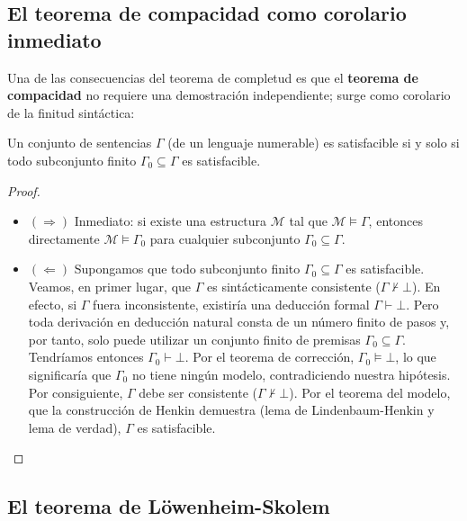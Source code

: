 \subsection{El teorema de compacidad como corolario inmediato}

Una de las consecuencias del teorema de completud es que el
\textbf{teorema de compacidad} no requiere una demostración
independiente; surge como corolario de la finitud sintáctica: 

\begin{corollary}
Un conjunto de sentencias $\Gamma$ (de un lenguaje numerable) es satisfacible si y solo si todo subconjunto finito $\Gamma_0 \subseteq \Gamma$ es satisfacible.
\end{corollary}

\begin{proof}\mbox{}
\begin{itemize}
    \item $(\Rightarrow)$ Inmediato: si existe una estructura $\mathcal{M}$ tal que $\mathcal{M} \models \Gamma$, entonces directamente $\mathcal{M} \models \Gamma_0$ para cualquier subconjunto $\Gamma_0 \subseteq \Gamma$.
    \item $(\Leftarrow)$ Supongamos que todo subconjunto finito
      $\Gamma_0 \subseteq \Gamma$ es satisfacible. Veamos, en primer
      lugar, que $\Gamma$ es sintácticamente consistente ($\Gamma
      \nvdash \bot$). En efecto, si $\Gamma$ fuera inconsistente,
      existiría una deducción formal $\Gamma \vdash \bot$. Pero toda
      derivación en deducción natural consta de un número finito de
      pasos y, por tanto, solo puede utilizar un conjunto finito de
      premisas $\Gamma_0 \subseteq \Gamma$. Tendríamos entonces
      $\Gamma_0 \vdash \bot$. Por el teorema de corrección, $\Gamma_0
      \models \bot$, lo que significaría que $\Gamma_0$ no tiene
      ningún modelo, contradiciendo nuestra hipótesis.   
    Por consiguiente, $\Gamma$ debe ser consistente ($\Gamma \nvdash \bot$). Por el teorema del modelo, que la construcción de Henkin demuestra (lema de Lindenbaum-Henkin y lema de verdad), $\Gamma$ es satisfacible. \qedhere
\end{itemize}
\end{proof}

\subsection{El teorema de Löwenheim-Skolem}

